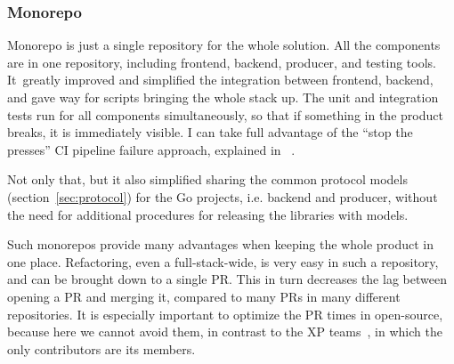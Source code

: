 \subsubsection{Monorepo}\label{sec:monorepo}

Monorepo is just a single repository
for the whole solution.
All the components are in one repository,
including frontend,
backend,
producer, and
testing tools.
It~greatly improved and simplified
the integration between frontend, backend,
and gave way for scripts
bringing the whole stack up.
The unit and integration tests run for all
components simultaneously,
so that if something in the product breaks,
it is immediately visible.
I can take full advantage of the
``stop the presses'' \ac{CI} pipeline failure approach,
explained in ~\cite{martin_clean_2011}.

Not only that,
but it also simplified sharing
the common protocol models (section~\ref{sec:protocol})
for the Go projects, i.e. backend and producer,
without the need for additional procedures
for releasing the libraries with models.

Such monorepos provide many advantages
when keeping the whole product in one place.
Refactoring,
even a full-stack-wide,
is very easy in such a repository,
and can be brought down to a single \ac{PR}.
This in turn decreases the lag between
opening a \ac{PR} and merging it,
compared to many \acp{PR} in many different repositories.
It is especially important
to optimize the \ac{PR} times in open-source,
because here we cannot avoid them,
in contrast to the \ac{XP} teams~\cite{beck_extreme_2004},
in which the only contributors are its members.
